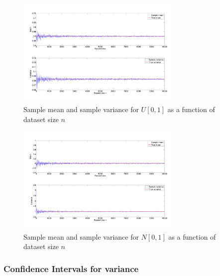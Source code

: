 \documentclass[10pt]{article}
\begin{document}
\begin{figure}[h]
  \centering
  \includegraphics[width=0.7\textwidth]{images/hw1_4_a_uni}
  \caption{Sample mean and sample variance for $U[0,1]$ as a function of dataset size $n$}
  \label{fig:uni_n}
\end{figure}


\begin{figure}[h]
  \centering
  \includegraphics[width=0.7\textwidth]{images/hw1_4_a_norm}
  \caption{Sample mean and sample variance for $N[0,1]$ as a function of dataset size $n$}
  \label{fig:norm_n}
\end{figure}

\subsubsection*{Confidence Intervals for variance}
\end{document}
